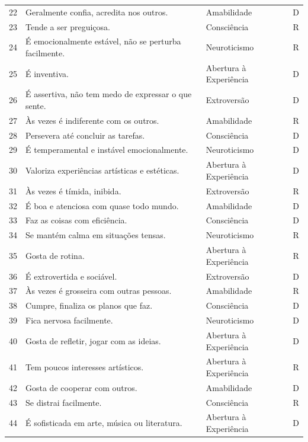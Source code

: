 \begin{quadro}[htbp]
\begin{tabular}{rp{7.6cm}lc}
        22 & Geralmente confia, acredita nos outros. & Amabilidade & D \\
        23 & Tende a ser preguiçosa. & Consciência & R \\
        24 & É emocionalmente estável, não se perturba facilmente. & Neuroticismo & R \\
        25 & É inventiva. & Abertura à Experiência & D \\
        26 & É assertiva, não tem medo de expressar o que sente. & Extroversão & D \\
        27 & Às vezes é indiferente com os outros. & Amabilidade & R \\
        28 & Persevera até concluir as tarefas. & Consciência & D \\
        29 & É temperamental e instável emocionalmente. & Neuroticismo & D \\
        30 & Valoriza experiências artísticas e estéticas. & Abertura à Experiência & D \\
        31 & Às vezes é tímida, inibida. & Extroversão & R \\
        32 & É boa e atenciosa com quase todo mundo. & Amabilidade & D \\
        33 & Faz as coisas com eficiência. & Consciência & D \\
        34 & Se mantém calma em situações tensas. & Neuroticismo & R \\
        35 & Gosta de rotina. & Abertura à Experiência & R \\
        36 & É extrovertida e sociável. & Extroversão & D \\
        37 & Às vezes é grosseira com outras pessoas. & Amabilidade & R \\
        38 & Cumpre, finaliza os planos que faz. & Consciência & D \\
        39 & Fica nervosa facilmente. & Neuroticismo & D \\
        40 & Gosta de refletir, jogar com as ideias. & Abertura à Experiência & D \\
        41 & Tem poucos interesses artísticos. & Abertura à Experiência & R \\
        42 & Gosta de cooperar com outros. & Amabilidade & D \\
        43 & Se distrai facilmente. & Consciência & R \\
        44 & É sofisticada em arte, música ou literatura. & Abertura à Experiência & D \\
        \bottomrule
    \end{tabular}
\end{quadro}

